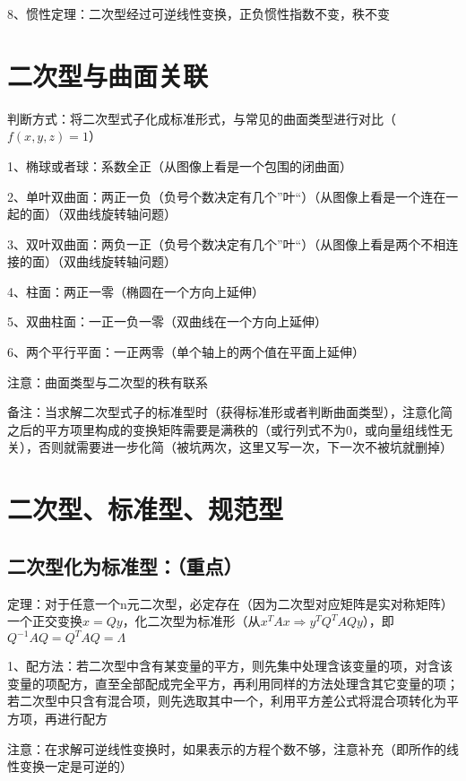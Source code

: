 8、惯性定理：二次型经过可逆线性变换，正负惯性指数不变，秩不变

\section{二次型与曲面关联}

判断方式：将二次型式子化成标准形式，与常见的曲面类型进行对比（$f(x,y,z)=1$）

1、椭球或者球：系数全正（从图像上看是一个包围的闭曲面）

2、单叶双曲面：两正一负（负号个数决定有几个”叶“）（从图像上看是一个连在一起的面）（双曲线旋转轴问题）

3、双叶双曲面：两负一正（负号个数决定有几个”叶“）（从图像上看是两个不相连接的面）（双曲线旋转轴问题）

4、柱面：两正一零（椭圆在一个方向上延伸）

5、双曲柱面：一正一负一零（双曲线在一个方向上延伸）

6、两个平行平面：一正两零（单个轴上的两个值在平面上延伸）

注意：曲面类型与二次型的秩有联系

备注：当求解二次型式子的标准型时（获得标准形或者判断曲面类型），注意化简之后的平方项里构成的变换矩阵需要是满秩的（或行列式不为0，或向量组线性无关），否则就需要进一步化简（被坑两次，这里又写一次，下一次不被坑就删掉）

\section{二次型、标准型、规范型}



\subsection{二次型化为标准型：（重点）}

定理：对于任意一个n元二次型，必定存在（因为二次型对应矩阵是实对称矩阵）一个正交变换$x=Qy$，化二次型为标准形（从$x^TAx \Rightarrow y^TQ^TAQy$），即$Q^{-1}AQ=Q^TAQ=\Lambda$

1、配方法：若二次型中含有某变量的平方，则先集中处理含该变量的项，对含该变量的项配方，直至全部配成完全平方，再利用同样的方法处理含其它变量的项；若二次型中只含有混合项，则先选取其中一个，利用平方差公式将混合项转化为平方项，再进行配方

注意：在求解可逆线性变换时，如果表示的方程个数不够，注意补充（即所作的线性变换一定是可逆的）

